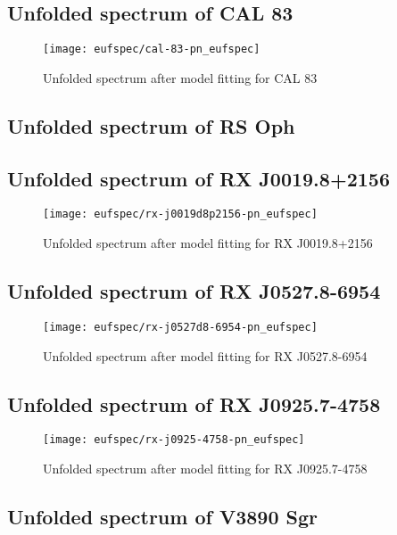 		\subsection*{Unfolded spectrum of CAL 83}
			\begin{figure}[h!]
				\centering
				\texttt{[image: eufspec/cal-83-pn\_eufspec]}
				\caption{Unfolded spectrum after model fitting for CAL 83}
				\label{result:euf-cal-83}
			\end{figure}
		
		\subsection*{Unfolded spectrum of RS Oph}
		
		\subsection*{Unfolded spectrum of RX J0019.8+2156}
			\begin{figure}[h!]
				\centering
				\texttt{[image: eufspec/rx-j0019d8p2156-pn\_eufspec]}
				\caption{Unfolded spectrum after model fitting for RX J0019.8+2156}
				\label{result:euf-rx-j0019}
			\end{figure}
		
		\subsection*{Unfolded spectrum of RX J0527.8-6954}
			\begin{figure}[h!]
				\centering
				\texttt{[image: eufspec/rx-j0527d8-6954-pn\_eufspec]}
				\caption{Unfolded spectrum after model fitting for RX J0527.8-6954}
				\label{result:euf-rx-j0527}
			\end{figure}
		
		\subsection*{Unfolded spectrum of RX J0925.7-4758}
			\begin{figure}[h!]
				\centering
				\texttt{[image: eufspec/rx-j0925-4758-pn\_eufspec]}
				\caption{Unfolded spectrum after model fitting for RX J0925.7-4758}
				\label{result:euf-rx-j0925}
			\end{figure}
		
		\subsection*{Unfolded spectrum of V3890 Sgr}
	
